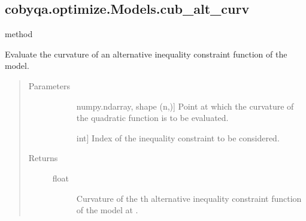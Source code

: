 \documentclass[letterpaper,10pt,english]{sphinxmanual}
\begin{document}
\begin{fulllineitems}
\begin{fulllineitems}
\begin{quote}
\begin{description}
\end{description}\end{quote}

\end{fulllineitems}



\subsection{cobyqa.optimize.Models.cub\_alt\_curv}
\label{\detokenize{refs/generated/cobyqa.optimize.Models.cub_alt_curv:cobyqa-optimize-models-cub-alt-curv}}\label{\detokenize{refs/generated/cobyqa.optimize.Models.cub_alt_curv::doc}}
\sphinxAtStartPar
method

\begin{fulllineitems}
\label{\detokenize{refs/generated/cobyqa.optimize.Models.cub_alt_curv:cobyqa.optimize.Models.cub_alt_curv}}
\sphinxAtStartPar
Evaluate the curvature of an alternative inequality constraint function
of the model.
\begin{quote}\begin{description}
\item[{Parameters}] \leavevmode\begin{description}
\item[{}] \leavevmode{[}numpy.ndarray, shape (n,){]}
\sphinxAtStartPar
Point at which the curvature of the quadratic function is to be
evaluated.

\item[{}] \leavevmode{[}int{]}
\sphinxAtStartPar
Index of the inequality constraint to be considered.

\end{description}

\item[{Returns}] \leavevmode\begin{description}
\item[{float}] \leavevmode
\sphinxAtStartPar
Curvature of the \sphinxhyphen{}th alternative inequality constraint function
of the model at .

\end{description}


\end{description}
\end{quote}
\end{fulllineitems}
\end{fulllineitems}
\end{document}
